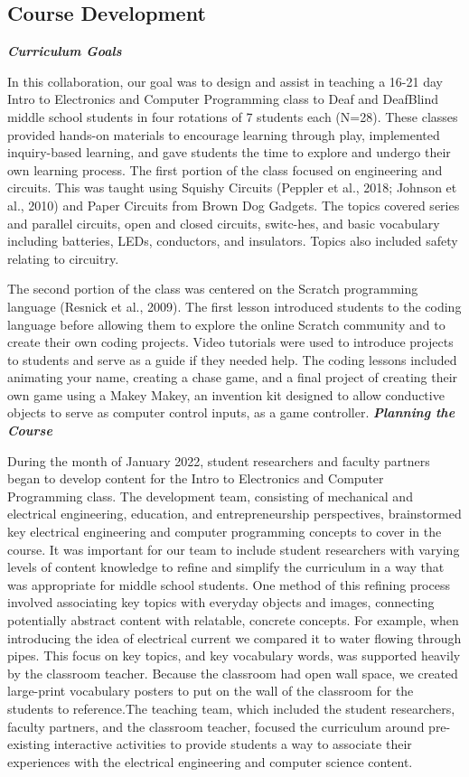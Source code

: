 \documentclass[11.5pt]{sig-alternate}
\begin{document}
\begin{large}
\section*{ Course Development}
\textbf{\textit{ Curriculum Goals}}

In this collaboration, our goal was to design and assist in teaching a 16-21 day Intro to Electronics and Computer Programming class to Deaf and DeafBlind middle school students in four rotations of 7 students each (N=28). These classes provided hands-on materials to encourage learning through play, implemented inquiry-based learning, and gave students the time to explore and undergo their own learning process. The first portion of the class focused on engineering and circuits. This was taught using Squishy Circuits (Peppler et al., 2018; Johnson et al., 2010) and Paper Circuits from Brown Dog Gadgets. The topics covered series and parallel circuits, open and closed circuits, switc-hes, and basic vocabulary including batteries, LEDs, conductors, and insulators. Topics also included safety relating to circuitry.

The second portion of the class was centered on the Scratch programming language (Resnick et al., 2009). The first lesson introduced students to the coding language before allowing them to explore the online Scratch community and to create their own coding projects. Video tutorials were used to introduce projects to students and serve as a guide if they needed help. The coding lessons included animating your name, creating a chase game, and a final project of creating their own game using a Makey Makey, an invention kit designed to allow conductive objects to serve as computer control inputs, as a game controller.
\newpage
\textbf{\textit{Planning the Course }}

During the month of January 2022, student researchers and faculty partners began to develop content for the Intro to Electronics and Computer Programming class. The development team, consisting of mechanical and electrical engineering, education, and entrepreneurship perspectives, brainstormed key electrical engineering and computer programming concepts to cover in the course. It was important for our team to include student researchers with varying levels of content knowledge to refine and simplify the curriculum in a way that was appropriate for middle school students. One method of this refining process involved associating key topics with everyday objects and images, connecting potentially abstract content with relatable, concrete concepts. For example, when introducing the idea of electrical current we compared it to water flowing through pipes. This focus on key topics, and key vocabulary words, was supported heavily by the classroom teacher. Because the classroom had open wall space, we created large-print vocabulary posters to put on the wall of the classroom for the students to reference.The teaching team, which included the student researchers, faculty partners, and the classroom teacher, focused the curriculum around pre-existing interactive activities to provide students a way to associate their experiences with the electrical engineering and computer science content.


\end{large}
\end{document}

